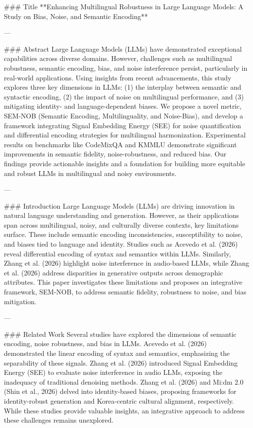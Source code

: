 ### Title  
**Enhancing Multilingual Robustness in Large Language Models: A Study on Bias, Noise, and Semantic Encoding**

---

### Abstract  
Large Language Models (LLMs) have demonstrated exceptional capabilities across diverse domains. However, challenges such as multilingual robustness, semantic encoding, bias, and noise interference persist, particularly in real-world applications. Using insights from recent advancements, this study explores three key dimensions in LLMs: (1) the interplay between semantic and syntactic encoding, (2) the impact of noise on multilingual performance, and (3) mitigating identity- and language-dependent biases. We propose a novel metric, SEM-NOB (Semantic Encoding, Multilinguality, and Noise-Bias), and develop a framework integrating Signal Embedding Energy (SEE) for noise quantification and differential encoding strategies for multilingual harmonization. Experimental results on benchmarks like CodeMixQA and KMMLU demonstrate significant improvements in semantic fidelity, noise-robustness, and reduced bias. Our findings provide actionable insights and a foundation for building more equitable and robust LLMs in multilingual and noisy environments.

---

### Introduction  
Large Language Models (LLMs) are driving innovation in natural language understanding and generation. However, as their applications span across multilingual, noisy, and culturally diverse contexts, key limitations surface. These include semantic encoding inconsistencies, susceptibility to noise, and biases tied to language and identity. Studies such as Acevedo et al. (2026) reveal differential encoding of syntax and semantics within LLMs. Similarly, Zhang et al. (2026) highlight noise interference in audio-based LLMs, while Zhang et al. (2026) address disparities in generative outputs across demographic attributes. This paper investigates these limitations and proposes an integrative framework, SEM-NOB, to address semantic fidelity, robustness to noise, and bias mitigation.  

---

### Related Work  
Several studies have explored the dimensions of semantic encoding, noise robustness, and bias in LLMs. Acevedo et al. (2026) demonstrated the linear encoding of syntax and semantics, emphasizing the separability of these signals. Zhang et al. (2026) introduced Signal Embedding Energy (SEE) to evaluate noise interference in audio LLMs, exposing the inadequacy of traditional denoising methods. Zhang et al. (2026) and Mi:dm 2.0 (Shin et al., 2026) delved into identity-based biases, proposing frameworks for identity-robust generation and Korea-centric cultural alignment, respectively. While these studies provide valuable insights, an integrative approach to address these challenges remains unexplored.  

